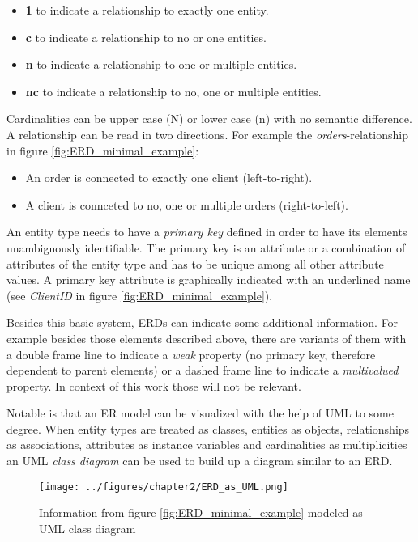 \documentclass[twoside, openright, 12pt]{book}
\begin{document}
\begin{itemize}
\setlength\itemsep{0em}
\item \textbf{1} to indicate a relationship to exactly one entity.
\item \textbf{c} to indicate a relationship to no or one entities.
\item \textbf{n} to indicate a relationship to one or multiple entities.
\item \textbf{nc} to indicate a relationship to no, one or multiple entities.
\end{itemize}

\noindent
Cardinalities can be upper case (N) or lower case (n) with no semantic difference.
A relationship can be read in two directions.
For example the \textit{orders}-relationship in figure \ref{fig:ERD_minimal_example}:

\begin{itemize}
\setlength\itemsep{0em}
\item An order is connected to exactly one client (left-to-right).
\item A client is connceted to no, one or multiple orders (right-to-left).
\end{itemize}

\noindent
An entity type needs to have a \textit{primary key} defined in order to have its elements unambiguously identifiable.
The primary key is an attribute or a combination of attributes of the entity type and has to be unique among all other attribute values.
A primary key attribute is graphically indicated with an underlined name (see \textit{ClientID} in figure \ref{fig:ERD_minimal_example}).

Besides this basic system, ERDs can indicate some additional information.
For example besides those elements described above, there are variants of them with a double frame line to indicate a \textit{weak} property (no primary key, therefore dependent to parent elements) or a dashed frame line to indicate a \textit{multivalued} property.
In context of this work those will not be relevant.

Notable is that an ER model can be visualized with the help of UML to some degree.
When entity types are treated as classes, entities as objects, relationships as associations, attributes as instance variables and cardinalities as multiplicities an UML \textit{class diagram} can be used to build up a diagram similar to an ERD.

\begin{figure}[htb]
	\centering
	\texttt{[image: ../figures/chapter2/ERD\_as\_UML.png]}
	\caption{Information from figure \ref{fig:ERD_minimal_example} modeled as UML class diagram}
	\label{fig:ERD_as_UML}
\end{figure}
\end{document}
